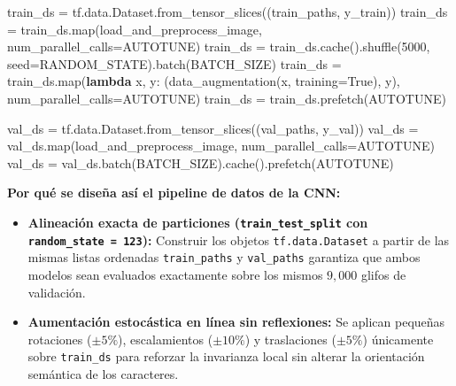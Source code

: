 \documentclass[
  spanish,
  us-letterpaper,
]{scrreprt}
\newenvironment{Shaded}{\begin{snugshade}}{\end{snugshade}}
\newcommand{\BuiltInTok}[1]{\textcolor[rgb]{0.00,0.23,0.31}{#1}}
\newcommand{\DecValTok}[1]{\textcolor[rgb]{0.68,0.00,0.00}{#1}}
\newcommand{\KeywordTok}[1]{\textcolor[rgb]{0.00,0.23,0.31}{\textbf{#1}}}
\newcommand{\NormalTok}[1]{\textcolor[rgb]{0.00,0.23,0.31}{#1}}
\newcommand{\OperatorTok}[1]{\textcolor[rgb]{0.37,0.37,0.37}{#1}}
\newcommand{\VariableTok}[1]{\textcolor[rgb]{0.07,0.07,0.07}{#1}}
\providecommand{\tightlist}{%
  \setlength{\itemsep}{0pt}\setlength{\parskip}{0pt}}
\theoremstyle{definition}
\theoremstyle{remark}
\begin{document}
\begin{Shaded}
\begin{Highlighting}[]
\NormalTok{train\_ds }\OperatorTok{=}\NormalTok{ tf.data.Dataset.from\_tensor\_slices((train\_paths, y\_train))}
\NormalTok{train\_ds }\OperatorTok{=}\NormalTok{ train\_ds.}\BuiltInTok{map}\NormalTok{(load\_and\_preprocess\_image, num\_parallel\_calls}\OperatorTok{=}\NormalTok{AUTOTUNE)}
\NormalTok{train\_ds }\OperatorTok{=}\NormalTok{ train\_ds.cache().shuffle(}\DecValTok{5000}\NormalTok{, seed}\OperatorTok{=}\NormalTok{RANDOM\_STATE).batch(BATCH\_SIZE)}
\NormalTok{train\_ds }\OperatorTok{=}\NormalTok{ train\_ds.}\BuiltInTok{map}\NormalTok{(}\KeywordTok{lambda}\NormalTok{ x, y: (data\_augmentation(x, training}\OperatorTok{=}\VariableTok{True}\NormalTok{), y), num\_parallel\_calls}\OperatorTok{=}\NormalTok{AUTOTUNE)}
\NormalTok{train\_ds }\OperatorTok{=}\NormalTok{ train\_ds.prefetch(AUTOTUNE)}

\NormalTok{val\_ds }\OperatorTok{=}\NormalTok{ tf.data.Dataset.from\_tensor\_slices((val\_paths, y\_val))}
\NormalTok{val\_ds }\OperatorTok{=}\NormalTok{ val\_ds.}\BuiltInTok{map}\NormalTok{(load\_and\_preprocess\_image, num\_parallel\_calls}\OperatorTok{=}\NormalTok{AUTOTUNE)}
\NormalTok{val\_ds }\OperatorTok{=}\NormalTok{ val\_ds.batch(BATCH\_SIZE).cache().prefetch(AUTOTUNE)}
\end{Highlighting}
\end{Shaded}

\textbf{Por qué se diseña así el pipeline de datos de la CNN:}

\begin{itemize}
\tightlist
\item
  \textbf{Alineación exacta de particiones (\texttt{train\_test\_split}
  con \texttt{random\_state\ =\ 123}):} Construir los objetos
  \texttt{tf.data.Dataset} a partir de las mismas listas ordenadas
  \texttt{train\_paths} y \texttt{val\_paths} garantiza que ambos
  modelos sean evaluados exactamente sobre los mismos \(9{,}000\) glifos
  de validación.
\item
  \textbf{Aumentación estocástica en línea sin reflexiones:} Se aplican
  pequeñas rotaciones (\(\pm 5\%\)), escalamientos (\(\pm 10\%\)) y
  traslaciones (\(\pm 5\%\)) únicamente sobre \texttt{train\_ds} para
  reforzar la invarianza local sin alterar la orientación semántica de
  los caracteres.
\end{itemize}
\end{document}

